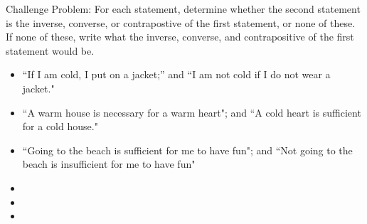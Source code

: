 \documentclass{article}
\theoremstyle{definition}
\begin{document}
	\noindent Challenge Problem:
	For each statement, determine whether the second statement is the inverse, converse, or contrapostive of the first statement, or none of these. If none of these, write what the inverse, converse, and contrapositive of the first statement would be.
	\begin{itemize}
		\item[(1)] ``If I am cold, I put on a jacket;'' and ``I am not cold if I do not wear a jacket."
		\item[(2)] ``A warm house is necessary for a warm heart"; and ``A cold heart is sufficient for a cold house."
		\item[(3)] ``Going to the beach is sufficient for me to have fun"; and ``Not going to the beach is insufficient for me to have fun"
	\end{itemize}
	\vspace{0.25cm}
	\begin{itemize}
		\item[(1)]
		\item[(2)]
		\item[(3)]
	\end{itemize}
\end{document}
